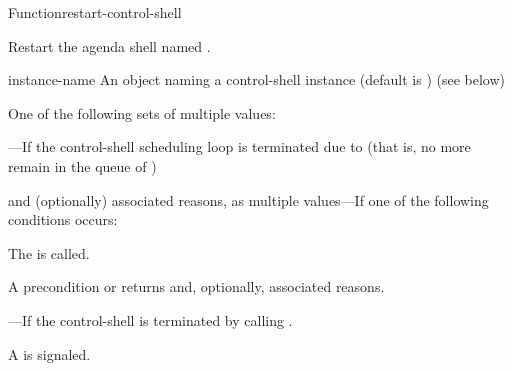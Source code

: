 \documentclass[10pt,twoside,english,pdftex]{article}
\begin{document}

\begin{functiondoc}{Function}{restart-control-shell}{%
    }
%
%
%

\fnsyntax

\fnpurpose Restart the agenda shell named .

\fnpackage {}

\fnmodule {}

%
\fnargs
\begin{args}{instance-name}
 An object naming a control-shell instance (default is 
) 
\arg[results] (see below)
\end{args}

\fnreturns
One of the following sets of multiple values: 
\begin{tightitemize}
\item {}---If the control-shell scheduling loop is terminated
  due to  (that is, no more  remain 
  in the queue of ) 
\item {} and (optionally) associated reasons, as multiple
  values---If one of the following conditions occurs:
\begin{tightitemize}
\item The   is
  called.
\item A precondition  or  
  returns  and, optionally, associated reasons.
\end{tightitemize}
\item {}---If the control-shell is terminated by
  calling .
\end{tightitemize}

\fnevents
{}%
%
%
%
%
%
A  is signaled.
 

\end{functiondoc}
\end{document}

